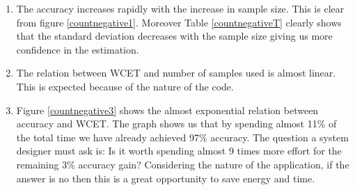 \begin{enumerate}
\item The accuracy increases rapidly with the increase in sample size. This is clear from figure \ref{countnegative1}. Moreover Table \ref{countnegativeT} clearly shows that the standard deviation decreases with the sample size giving us more confidence in the estimation.
\item The relation between WCET and number of samples used is almost linear. This is expected because of the nature of the code.
\item Figure \ref{countnegative3} shows the almost exponential relation between accuracy and WCET. The graph shows us that by spending almost 11\% of the total time we have already achieved 97\% accuracy. The question a system designer must ask is: Is it worth spending almost 9 times more effort for the remaining 3\% accuracy gain? Considering the nature of the application, if the answer is no then this is a great opportunity to save energy and time.
\end{enumerate}



